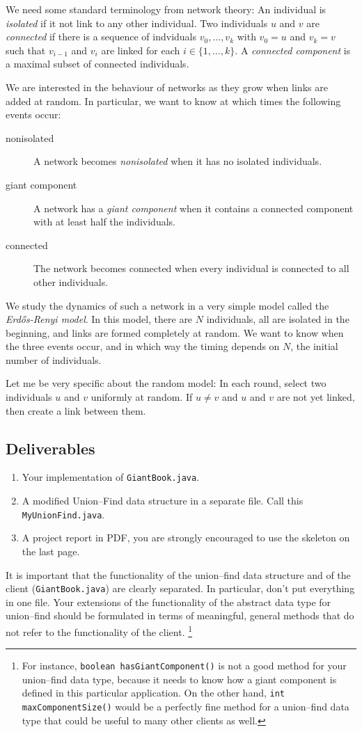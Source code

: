 \documentclass{tufte-handout}
\begin{document}
We need some standard terminology from network theory:
An individual is \emph{isolated} if it not link to any other individual.
Two individuals $u$ and $v$ are \emph{connected} if there is a sequence of indviduals $v_0,\ldots,v_k$ with $v_0=u$ and $v_k=v$ such that $v_{i-1}$ and $v_i$ are linked for each $i\in\{1,\ldots,k\}$.
A \emph{connected component} is a maximal subset of connected individuals.

We are interested in the behaviour of networks as they grow when links are added at random.
In particular, we want to know at which times the following events occur:
\begin{description}
\item[nonisolated]
  A network becomes \emph{nonisolated} when it has no isolated individuals.
\item[giant component] A network has a \emph{giant component} when
  it contains a connected component with at least half the individuals.
\item[connected] The network becomes connected when every individual is connected
  to all other individuals.
\end{description}
  We study the dynamics of such a network in a very simple model
  called the \emph{Erd\H{o}s-Renyi model}.
  In this model, there are $N$ individuals, all are isolated in the beginning, and links are formed completely at random.
  We want to know when the three events occur, and in which way the timing
  depends on $N$, the initial number of individuals.

  Let me be very specific about the random model:
  In each round, select two individuals $u$ and $v$ uniformly at random.
  If $u\neq v$ and $u$ and $v$ are not yet linked, then create a link between them.

\subsection{Deliverables}
\begin{enumerate}
\item Your implementation of {\tt GiantBook.java}.
\item A modified Union--Find data structure in a separate file.
	Call this {\tt MyUnionFind.java}. 
\item A project report in PDF, you are strongly encouraged to use the skeleton on the last page.
\end{enumerate}

It is important that the functionality of the union--find data
structure and of the client ({\tt GiantBook.java}) are clearly
separated.
In particular, don't put everything in one file.
Your extensions of the functionality of the abstract data type for union--find should be formulated in terms of meaningful, general methods that do not refer to the functionality of the client. 
\footnote{For instance, {\tt boolean hasGiantComponent()} is not a good method for your union--find data type, because it needs to know how a giant component is defined in this particular application. On the other hand, {\tt int maxComponentSize()} would be a perfectly fine method for a union--find data type that could be useful to many other clients as well.}
\end{document}
